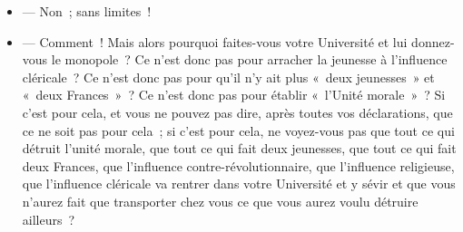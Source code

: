 \documentclass[french,twoside]{book} %
\begin{document}
\begin{itemize}[itemsep=0pt,]
\item  — Non ; sans limites !
\item  — Comment ! Mais alors pourquoi faites-vous votre Université et lui donnez-vous le monopole ? Ce n’est donc pas pour arracher la jeunesse à l’influence  cléricale ? Ce n’est donc pas pour qu’il n’y ait plus « deux jeunesses » et « deux Frances » ? Ce n’est donc pas pour établir « l’Unité morale » ? Si c’est pour cela, et vous ne pouvez pas dire, après toutes vos déclarations, que ce ne soit pas pour cela ; si c’est pour cela, ne voyez-vous pas que tout ce qui détruit l’unité morale, que tout ce qui fait deux jeunesses, que tout ce qui fait deux Frances, que l’influence contre-révolutionnaire, que l’influence religieuse, que l’influence cléricale va rentrer dans votre Université et y sévir et que vous n’aurez fait que transporter chez vous ce que vous aurez voulu détruire ailleurs ?
\end{itemize}
\end{document}
